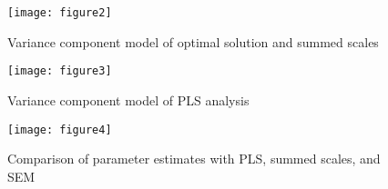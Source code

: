 \documentclass[10pt]{report}
\begin{document}
%
%


\begin{figure}[h!]
\centering
\texttt{[image: figure2]}
\caption{Variance component model of optimal solution and summed scales}
\end{figure}

\begin{figure}[h!]
\centering
\texttt{[image: figure3]}
\caption{Variance component model of PLS analysis}
\end{figure}

\begin{figure}[h!]
\centering
\texttt{[image: figure4]}
\caption{Comparison of parameter estimates with PLS, summed scales, and  SEM}
\end{figure}



%
%

\end{document}
